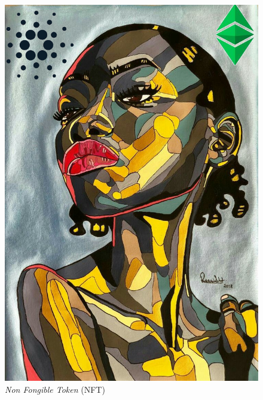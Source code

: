 \documentclass[presentation]{beamer}
\begin{document}
\begin{frame}
\begin{columns}
\begin{column}{0.43\columnwidth}
\begin{block}
{\begin{figure}[htbp]
\includegraphics[width=.8\textwidth]{./Pictures/logos/tokens_applicatifs.png}
\caption{\emph{Non Fongible Token} (NFT)}
\end{figure}
}
\end{block}
\end{column}
\end{columns}
\end{frame}
\end{document}
